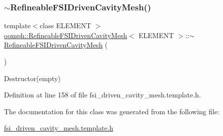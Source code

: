 \subsubsection{\texorpdfstring{$\sim$\+Refineable\+F\+S\+I\+Driven\+Cavity\+Mesh()}{~RefineableFSIDrivenCavityMesh()}}
{\footnotesize\ttfamily template$<$class E\+L\+E\+M\+E\+NT $>$ \\
\hyperlink{classoomph_1_1RefineableFSIDrivenCavityMesh}{oomph\+::\+Refineable\+F\+S\+I\+Driven\+Cavity\+Mesh}$<$ E\+L\+E\+M\+E\+NT $>$\+::$\sim$\hyperlink{classoomph_1_1RefineableFSIDrivenCavityMesh}{Refineable\+F\+S\+I\+Driven\+Cavity\+Mesh} (\begin{DoxyParamCaption}{ }\end{DoxyParamCaption})\hspace{0.3cm}{\ttfamily [inline]}}



Destructor(empty) 



Definition at line 158 of file fsi\+\_\+driven\+\_\+cavity\+\_\+mesh.\+template.\+h.



The documentation for this class was generated from the following file\+:\begin{DoxyCompactItemize}
\item 
\hyperlink{fsi__driven__cavity__mesh_8template_8h}{fsi\+\_\+driven\+\_\+cavity\+\_\+mesh.\+template.\+h}\end{DoxyCompactItemize}
